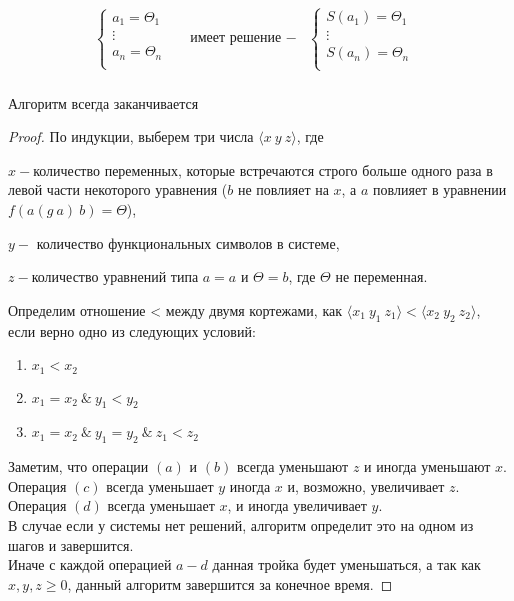 	\begin{align*}
		\begin{cases}
			a_1=\Theta_1&\\
			\vdots&\\
			a_n=\Theta_n&\\
		\end{cases} & \text{имеет решение }-&\begin{cases}
			S(a_1)=\Theta_1&\\
			\vdots&\\
			S(a_n)=\Theta_n&\\
		\end{cases}\\
	\end{align*}
	\begin{statement}Алгоритм всегда заканчивается\end{statement}
	\begin{proof}По индукции, выберем три числа $ \big \langle x\:y\:z\big \rangle$, где\par $x-$количество переменных, которые встречаются строго больше одного раза в левой части некоторого уравнения ($b$ не повлияет на $x$, а $a$ повлияет в уравнении $f(a(g\:a)\:b)=\Theta$),\par $y-$ количество функциональных символов в системе,\par $z-$количество уравнений типа $a=a$ и $\Theta=b$, где $\Theta$ не переменная.\par Определим отношение <  между двумя кортежами,	 как $\big \langle x_1\:y_1\:z_1\big \rangle < \big \langle x_2\:y_2\:z_2\big \rangle$, если верно одно из следующих условий:\\ \begin{enumerate}
	\item $x_1 < x_2$
	\item $x_1 = x_2 \:\& \:y_1 < y_2$
	\item $x_1 = x_2 \:\&  \:y_1 = y_2 \:\& \:z_1 < z_2$
	\end{enumerate}
		Заметим, что операции $(a)$ и $(b)$ всегда уменьшают $z$ и иногда уменьшают $x$.\\ Операция $(c)$ всегда уменьшает $y$ иногда $x$ и, возможно, увеличивает $z$. \\
		Операция $(d)$ всегда уменьшает $x$, и иногда увеличивает $y$. \\
		В случае если у системы нет решений, алгоритм определит это на одном из шагов и завершится. \\
		Иначе с каждой операцией $a-d$ данная тройка будет уменьшаться, а так как $x,y,z\geq 0$, данный алгоритм завершится за конечное время.
		\end{proof} 


